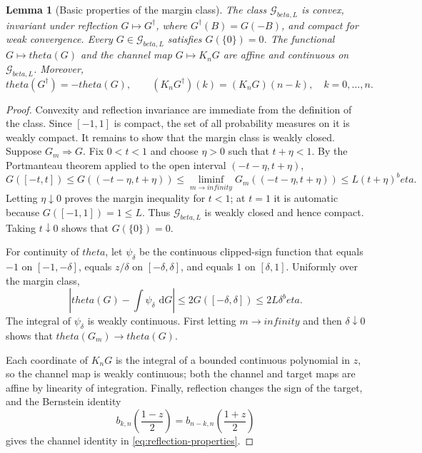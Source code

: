 \documentclass[11pt]{article}
\def\beta{beta}%
\def\theta{theta}%
\def\infty{infinity}%
\newtheorem{lemma}[theorem]{Lemma}
\newcommand{\calG}{\mathcal G}
\newcommand{\dd}{\,\mathrm d}
\begin{document}
\begin{lemma}[Basic properties of the margin class]
\label{lem:margin-class-properties}
The class $\calG_{\beta,L}$ is convex, invariant under reflection
$G\mapsto G^\dagger$, where $G^\dagger(B)=G(-B)$, and compact for weak convergence.  Every $G\in\calG_{\beta,L}$ satisfies $G(\{0\})=0$.  The functional $G\mapsto\theta(G)$ and the channel map $G\mapsto K_nG$ are affine and continuous on $\calG_{\beta,L}$.  Moreover,
\begin{equation}
\label{eq:reflection-properties}
\theta(G^\dagger)=-\theta(G),
\qquad
(K_nG^\dagger)(k)=(K_nG)(n-k),
\quad k=0,\dots,n.
\end{equation}
\end{lemma}

\begin{proof}
Convexity and reflection invariance are immediate from the definition of the class.  Since $[-1,1]$ is compact, the set of all probability measures on it is weakly compact.  It remains to show that the margin class is weakly closed.  Suppose $G_m\Rightarrow G$.  Fix $0<t<1$ and choose $\eta>0$ such that $t+\eta<1$.  By the Portmanteau theorem applied to the open interval $(-t-\eta,t+\eta)$,
\[
G([-t,t])
\le
G((-t-\eta,t+\eta))
\le
\liminf_{m\to\infty}G_m((-t-\eta,t+\eta))
\le
L(t+\eta)^\beta.
\]
Letting $\eta\downarrow0$ proves the margin inequality for $t<1$; at $t=1$ it is automatic because $G([-1,1])=1\le L$.  Thus $\calG_{\beta,L}$ is weakly closed and hence compact.  Taking $t\downarrow0$ shows that $G(\{0\})=0$.

For continuity of $\theta$, let $\psi_\delta$ be the continuous clipped-sign function that equals $-1$ on $[-1,-\delta]$, equals $z/\delta$ on $[-\delta,\delta]$, and equals $1$ on $[\delta,1]$.  Uniformly over the margin class,
\[
\left|\theta(G)-\int\psi_\delta\,\dd G\right|
\le
2G([-\delta,\delta])
\le
2L\delta^\beta.
\]
The integral of $\psi_\delta$ is weakly continuous.  First letting $m\to\infty$ and then $\delta\downarrow0$ shows that $\theta(G_m)\to\theta(G)$.

Each coordinate of $K_nG$ is the integral of a bounded continuous polynomial in $z$, so the channel map is weakly continuous; both the channel and target maps are affine by linearity of integration.  Finally, reflection changes the sign of the target, and the Bernstein identity
\[
b_{k,n}\!\left(\frac{1-z}{2}\right)
=
b_{n-k,n}\!\left(\frac{1+z}{2}\right)
\]
gives the channel identity in \eqref{eq:reflection-properties}.
\end{proof}
\end{document}
